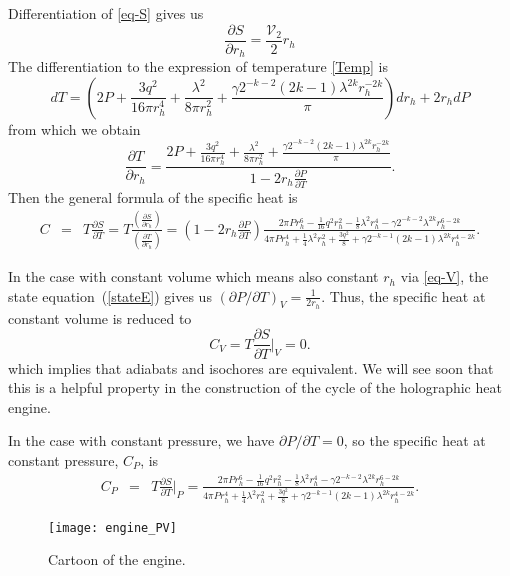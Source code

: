 \documentclass[preprint,showpacs,showkeys,onecolumn,nofootinbib]{revtex4}
\begin{document}
Differentiation of \eqref{eq-S} gives us
\begin{equation}
\frac{\partial S}{\partial r_h}=\frac{\mathcal{V}_2}{2}r_h
\end{equation}
The differentiation to the expression of temperature \eqref{Temp} is
\begin{equation}
dT= \left(2 P+\frac{3 q^2}{16 \pi  r_h^4}+\frac{\lambda ^2}{8 \pi  r_h^2}+\frac{\gamma  2^{-k-2} (2 k-1) \lambda ^{2 k} r_h^{-2 k}}{\pi }\right)d r_h+2  r_h d P
\end{equation}
from which we obtain
\begin{equation}
\frac{\partial T}{\partial r_h}=\frac{2 P+\frac{3 q^2}{16 \pi  r_h^4}+\frac{\lambda ^2}{8 \pi  r_h^2}+\frac{\gamma  2^{-k-2} (2 k-1) \lambda ^{2 k} r_h^{-2 k}}{\pi }}{1-2  r_h \frac{\partial P}{\partial T}}.
\end{equation}
Then the general formula of the specific heat is
 \begin{eqnarray}\label{eq-C}
 C&=&T\frac{\partial S}{\partial T}=T\frac{\left(\frac{\partial S}{\partial r_h}\right)}{\left(\frac{\partial T}{\partial r_h}\right)}=\left(1-2  r_h \frac{\partial P}{\partial T}\right)\frac{2 \pi  P r_h^6-\frac{1}{16} q^2 r_h^2-\frac{1}{8} \lambda ^2 r_h^4-\gamma 2^{-k-2} \lambda ^{2 k} r_h^{6-2 k}}{4
   \pi  P r_h^4+\frac{1}{4} \lambda ^2 r_h^2+\frac{3 q^2}{8}+\gamma  2^{-k-1} (2 k-1) \lambda ^{2 k} r_h^{4-2 k}}.
 \end{eqnarray}

In the case with constant volume which means also constant $r_h$ via \eqref{eq-V}, the state equation~(\ref{stateE}) gives us
$(\partial P/\partial T)_{V}=\frac{1}{2r_h}$. Thus, the specific heat at constant volume is reduced to
 \begin{equation}
 C_{V}=T\frac{\partial S}{\partial T}\big|_{V}=0.
 \end{equation}
which implies that adiabats and isochores are equivalent. We will see soon that this is a helpful property in the construction of
the cycle of the holographic heat engine.

In the case with constant pressure, we have $\partial P/\partial T=0$, so the specific heat at constant pressure, $C_P$, is
  \begin{eqnarray}\label{eq-Cp}
 C_P&=&T\frac{\partial S}{\partial T}\big|_P=\frac{2 \pi  P r_h^6-\frac{1}{16} q^2 r_h^2-\frac{1}{8} \lambda ^2 r_h^4-\gamma 2^{-k-2} \lambda ^{2 k} r_h^{6-2 k}}{4
   \pi  P r_h^4+\frac{1}{4} \lambda ^2 r_h^2+\frac{3 q^2}{8}+\gamma  2^{-k-1} (2 k-1) \lambda ^{2 k} r_h^{4-2 k}}.
 \end{eqnarray}
%
\begin{figure}[h]
{\centering
\texttt{[image: engine\_PV]}
   \caption{Cartoon of the engine.}   \label{fig-engine}}
\end{figure}
\end{document}
